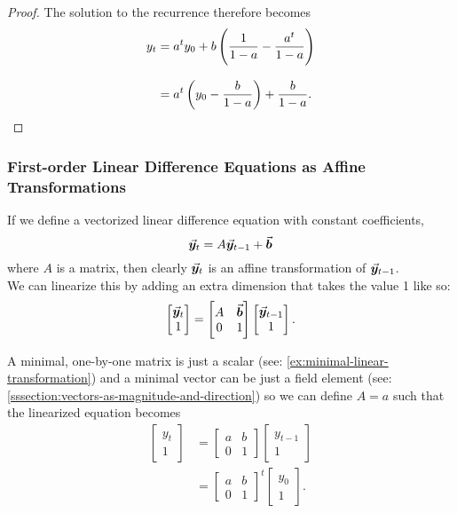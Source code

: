 \documentclass[../MathsNotesBase.tex]{subfiles}
\begin{document}
{\begin{proof}
			The solution to the recurrence therefore becomes
			\begin{align*}
			y_t &= a^t y_0 + b \left(\frac{1}{1 - a} - \frac{a^t}{1 - a}\right) \\[8pt]
			&= a^t \left(y_0 - \frac{b}{1-a}\right) + \frac{b}{1-a}. \qedhere \\
			\end{align*}
		\end{proof}
	
	
		\biggerskip
		\subsubsection{First-order Linear Difference Equations as Affine Transformations}
		\def\y{\V{y}}
		If we define a vectorized linear difference equation with constant coefficients,
		\[ \y_t = A\y_{t-1} + \b \]
		where $A$ is a matrix, then clearly $\y_t$ is an affine transformation of $\y_{t-1}$.\\
		
		We can linearize this by adding an extra dimension that takes the value 1 like so:
		\[	\begin{bmatrix}
				\y_t\\
				1
			\end{bmatrix} =
			\begin{bmatrix}
				A & \b\\
				0 & 1
	  		\end{bmatrix}
			\begin{bmatrix}
				\y_{t-1}\\
				1
			\end{bmatrix}.
		\]
		
		\bigskip
		A minimal, one-by-one matrix is just a scalar (see: \ref{ex:minimal-linear-transformation}) and a minimal vector can be just a field element (see: \ref{sssection:vectors-as-magnitude-and-direction}) so we can define ${ A = a }$ such that the linearized equation becomes
		\begin{align*}
			\begin{bmatrix}
				y_t\\
				1
			\end{bmatrix} &=
			\begin{bmatrix}
				a & b\\
				0 & 1
			\end{bmatrix}
			\begin{bmatrix}
				y_{t-1}\\
				1
			\end{bmatrix} \\[8pt]
			&=
			\begin{bmatrix}
				a & b\\
				0 & 1
			\end{bmatrix}^t
			\begin{bmatrix}
				y_0\\
				1
			\end{bmatrix}.
		\end{align*}
	
}
\end{document}
